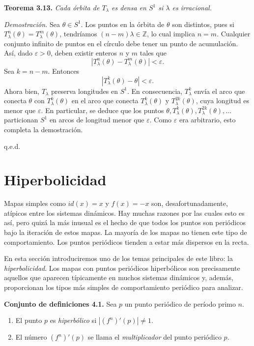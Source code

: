 \documentclass[10pt,a4paper]{book}
\begin{document}
\newpage

\textbf{Teorema 3.13.} \emph{Cada órbita de $T_{\lambda}$ es densa en $S^{1}$ si $\lambda$ es irracional.}

\bigskip

\emph{Demostración.} Sea $\theta \in S^{1}$.  
Los puntos en la órbita de $\theta$ son distintos, pues si $T_{\lambda}^{n}(\theta)=T_{\lambda}^{m}(\theta)$, tendríamos $(n-m)\lambda \in \mathbb{Z}$, lo cual implica $n=m$.  Cualquier conjunto infinito de puntos en el círculo debe tener un punto de acumulación. Así, dado $\varepsilon > 0$, deben existir enteros $n$ y $m$ tales que \[
|T_{\lambda}^{n}(\theta)-T_{\lambda}^{m}(\theta)| < \varepsilon.
\] Sea $k=n-m$. Entonces \[
|T_{\lambda}^{k}(\theta)-\theta| < \varepsilon.
\] Ahora bien, $T_{\lambda}$ preserva longitudes en $S^{1}$. En consecuencia, $T_{\lambda}^{k}$ envía el arco que conecta $\theta$ con $T_{\lambda}^{k}(\theta)$ en el arco que conecta $T_{\lambda}^{k}(\theta)$ y $T_{\lambda}^{2k}(\theta)$, cuya longitud es menor que $\varepsilon$. En particular, se deduce que los puntos $\theta, T_{\lambda}^{k}(\theta), T_{\lambda}^{2k}(\theta),\dots$ particionan $S^{1}$ en arcos de longitud menor que $\varepsilon$. Como $\varepsilon$ era arbitrario, esto completa la demostración.  

\hfill q.e.d.



\newpage

\section{Hiperbolicidad}

Mapas simples como $id(x)=x$ y $f(x)=-x$ son, desafortunadamente, atípicos entre los sistemas dinámicos.  
Hay muchas razones por las cuales esto es así, pero quizá la más inusual es el hecho de que todos los puntos son periódicos bajo la iteración de estos mapas.  
La mayoría de los mapas no tienen este tipo de comportamiento.  
Los puntos periódicos tienden a estar más dispersos en la recta.  

En esta sección introduciremos uno de los temas principales de este libro: la \emph{hiperbolicidad}.  
Los mapas con puntos periódicos hiperbólicos son precisamente aquellos que aparecen típicamente en muchos sistemas dinámicos y, además, proporcionan los tipos más simples de comportamiento periódico para analizar.

\medskip

\textbf{Conjunto de definiciones 4.1.} Sea $p$ un punto periódico de período primo $n$. 
\begin{enumerate}
	\item El punto $p$ es \emph{hiperbólico} si $|(f^{n})'(p)| \neq 1$.  
	\item El número $(f^{n})'(p)$ se llama el \emph{multiplicador} del punto periódico $p$.
\end{enumerate} 
\end{document}

